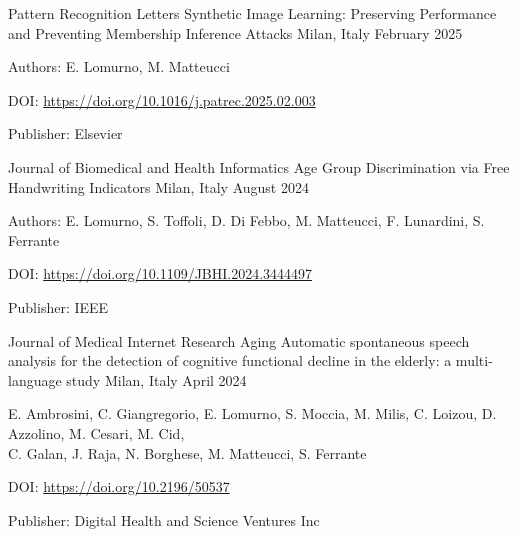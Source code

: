 \begin{cventries}
    \vspace{2mm}
    \cventry
        {Pattern Recognition Letters}
        {Synthetic Image Learning: Preserving Performance and Preventing Membership Inference Attacks}
        {Milan, Italy}
        {February 2025}
        {
        \begin{cvitems}
            \item {Authors: E. Lomurno, M. Matteucci}
            \item {DOI: \url{https://doi.org/10.1016/j.patrec.2025.02.003}}
            \item {Publisher: Elsevier}
        \end{cvitems}
        }

    \vspace{2mm}
    \cventry
        {Journal of Biomedical and Health Informatics}
        {Age Group Discrimination via Free Handwriting Indicators}
        {Milan, Italy}
        {August 2024}
        {
        \begin{cvitems}
            \item {Authors: E. Lomurno, S. Toffoli, D. Di Febbo, M. Matteucci, F. Lunardini, S. Ferrante}
            \item {DOI: \url{https://doi.org/10.1109/JBHI.2024.3444497}}
            \item {Publisher: IEEE}
        \end{cvitems}
        }

    \vspace{2mm}
    \cventry
        {Journal of Medical Internet Research Aging} %
        {Automatic spontaneous speech analysis for the detection of cognitive functional decline in the elderly: a multi-language study}
        {Milan, Italy}
        {April 2024}
        {
        \begin{cvitems}
            \item {E. Ambrosini, C. Giangregorio, E. Lomurno, S. Moccia, M. Milis, C. Loizou, D. Azzolino, M. Cesari, M. Cid, \\C. Galan, J. Raja, N. Borghese, M. Matteucci, S. Ferrante}
            \item {DOI: \url{https://doi.org/10.2196/50537}}
            \item {Publisher: Digital Health and Science Ventures Inc}
        \end{cvitems}
        }


\end{cventries}
